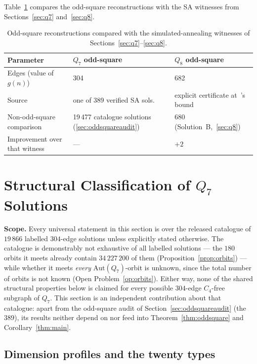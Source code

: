 \documentclass[12pt,a4paper]{article}
\theoremstyle{definition}
\begin{document}
Table~\ref{tab:oddsquare} compares the odd-square reconstructions with the SA
witnesses from Sections~\ref{sec:q7} and~\ref{sec:q8}.

\begin{table}[ht]
\centering\small
\caption{Odd-square reconstructions compared with the simulated-annealing
  witnesses of Sections~\ref{sec:q7}--\ref{sec:q8}.}
\label{tab:oddsquare}\medskip
\begin{tabular}{@{}lp{4.3cm}p{4.3cm}@{}}
\toprule
Parameter & $Q_7$ odd-square & $Q_8$ odd-square\\
\midrule
Edges (value of $g(n)$) & 304 & 682\\
Source & one of 389 verified SA sols. & explicit certificate at~\cite{MPR95}'s bound\\
Non-odd-square comparison & 19\,477 catalogue solutions (\ref{sec:oddsquareaudit}) & 680 (Solution~B,~\ref{sec:q8})\\
Improvement over that witness & --- & $+2$\\
\bottomrule
\end{tabular}
\end{table}

\section{Structural Classification of \texorpdfstring{$Q_7$}{Q7} Solutions}\label{sec:structure}
\noindent\textbf{Scope.} Every universal statement in this section is over
the released catalogue of $19\,866$ labelled $304$-edge solutions unless
explicitly stated otherwise. The catalogue is demonstrably not exhaustive of
all labelled solutions --- the $180$ orbits it meets already contain
$34\,227\,200$ of them (Proposition~\ref{prop:orbits}) --- while whether it
meets \emph{every} $\mathrm{Aut}(Q_7)$-orbit is unknown, since the total
number of orbits is not known (Open Problem~\ref{op:orbits}). Either way,
none of the shared structural properties below is claimed for every possible
$304$-edge $C_4$-free subgraph of $Q_7$. This section is an independent
contribution about that catalogue: apart from the odd-square audit of
Section~\ref{sec:oddsquareaudit} (the $389$), its results neither depend
on nor feed into Theorem~\ref{thm:oddsquare} and Corollary~\ref{thm:main}.


\subsection{Dimension profiles and the twenty types}\label{sec:profiles}
\end{document}
